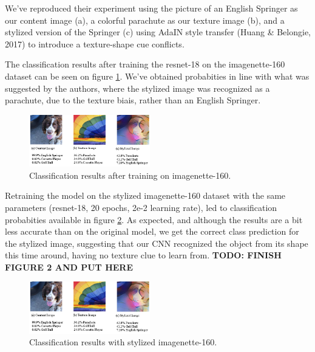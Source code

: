 \documentclass{article}
\begin{document}
\noindent
We've reproduced their experiment using the picture of an English Springer as our content image (a), 
a colorful parachute as our texture image (b),
and a stylized version of the Springer (c) using AdaIN style transfer 
(Huang \& Belongie, 2017) %
to introduce a texture-shape cue conflicts. \smallskip

\noindent
The classification results after training the resnet-18 on the imagenette-160 dataset 
can be seen on figure \ref{dog-parachute}.
We've obtained probabities in line with what was suggested by the authors, 
where the stylized image was recognized as a parachute, 
due to the texture biais, rather than an English Springer.

\begin{figure}[h!]\center
  \includegraphics[width=0.47\textwidth]{imgs/results-textures}
  \caption{Classification results after training on imagenette-160.}
  \label{dog-parachute}
\end{figure}

\noindent
Retraining the model on the stylized imagenette-160 dataset with the same parameters 
(resnet-18, 20 epochs, 2e-2 learning rate), 
led to classification probabities available in figure \ref{stylized-dog-parachute}.
As expected, and although the results are a bit less accurate than on the original model, 
we get the correct class prediction for the stylized image, suggesting that our CNN recognized the object
from its shape this time around, having no texture clue to learn from.
\textbf{TODO: FINISH FIGURE 2 AND PUT HERE}

\begin{figure}[h!]\center
  \includegraphics[width=0.47\textwidth]{imgs/results-textures}
  \caption{Classification results with stylized imagenette-160.}
  \label{stylized-dog-parachute}
\end{figure}
\end{document}
